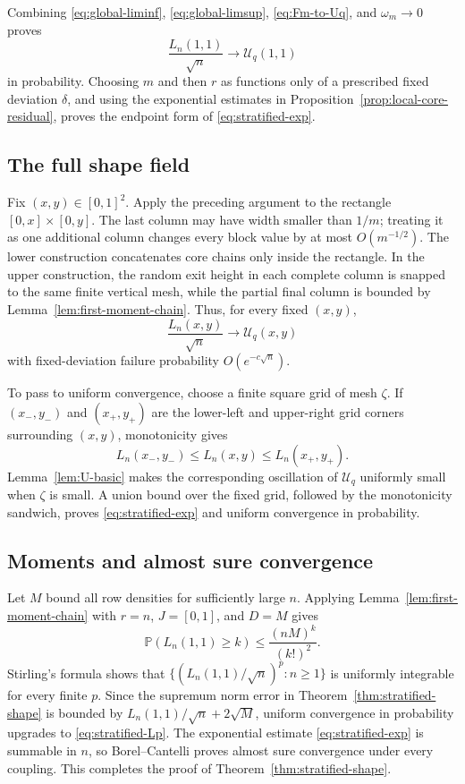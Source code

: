 \documentclass[11pt]{article}
\theoremstyle{remark}
\newcommand{\Pp}{\mathbb P}
\newcommand{\calU}{\mathcal U}
\begin{document}
Combining \eqref{eq:global-liminf}, \eqref{eq:global-limsup},
\eqref{eq:Fm-to-Uq}, and $\omega_m\to0$ proves
\begin{equation}\label{eq:endpoint-prob-conv}
        \frac{L_n(1,1)}{\sqrt n}
        \longrightarrow\calU_q(1,1)
\end{equation}
in probability.  Choosing $m$ and then $r$ as functions only of a prescribed
fixed deviation $\delta$, and using the exponential estimates in
Proposition~\ref{prop:local-core-residual}, proves the endpoint form of
\eqref{eq:stratified-exp}.

\subsection{The full shape field}

Fix $(x,y)\in[0,1]^2$.  Apply the preceding argument to the rectangle
$[0,x]\times[0,y]$.  The last column may have width smaller than
$1/m$; treating it as one additional column changes every block value by at
most $O(m^{-1/2})$.  The lower construction concatenates core chains only
inside the rectangle.  In the upper construction, the random exit height in
each complete column is snapped to the same finite vertical mesh, while the
partial final column is bounded by Lemma~\ref{lem:first-moment-chain}.  Thus,
for every fixed $(x,y)$,
\begin{equation}\label{eq:pointwise-field}
        \frac{L_n(x,y)}{\sqrt n}
        \longrightarrow\calU_q(x,y)
\end{equation}
with fixed-deviation failure probability $O(e^{-c\sqrt n})$.

To pass to uniform convergence, choose a finite square grid of mesh $\zeta$.
If $(x_-,y_-)$ and $(x_+,y_+)$ are the lower-left and upper-right grid corners
surrounding $(x,y)$, monotonicity gives
\[
        L_n(x_-,y_- )\le L_n(x,y)\le L_n(x_+,y_+).
\]
Lemma~\ref{lem:U-basic} makes the corresponding oscillation of $\calU_q$
uniformly small when $\zeta$ is small.  A union bound over the fixed grid,
followed by the monotonicity sandwich, proves \eqref{eq:stratified-exp} and
uniform convergence in probability.

\subsection{Moments and almost sure convergence}

Let $M$ bound all row densities for sufficiently large $n$.  Applying
Lemma~\ref{lem:first-moment-chain} with $r=n$, $J=[0,1]$, and $D=M$ gives
\begin{equation}\label{eq:global-chain-tail}
        \Pp(L_n(1,1)\ge k)
        \le\frac{(nM)^k}{(k!)^2}.
\end{equation}
Stirling's formula shows that
$\{(L_n(1,1)/\sqrt n)^p:n\ge1\}$ is uniformly integrable for every finite
$p$.  Since the supremum norm error in Theorem~\ref{thm:stratified-shape} is
bounded by $L_n(1,1)/\sqrt n+2\sqrt M$, uniform convergence in probability
upgrades to \eqref{eq:stratified-Lp}.  The exponential estimate
\eqref{eq:stratified-exp} is summable in $n$, so Borel--Cantelli proves almost
sure convergence under every coupling.  This completes the proof of
Theorem~\ref{thm:stratified-shape}.
\end{document}
